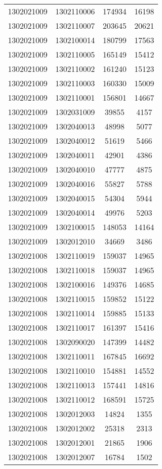 \begin{longtable}{llcc}
1302021009 & 1302110006 & 174934 & 16198\\
1302021009 & 1302110007 & 203645 & 20621\\
1302021009 & 1302100014 & 180799 & 17563\\
1302021009 & 1302110005 & 165149 & 15412\\
1302021009 & 1302110002 & 161240 & 15123\\
1302021009 & 1302110003 & 160330 & 15009\\
1302021009 & 1302110001 & 156801 & 14667\\
1302021009 & 1302031009 & 39855 & 4157\\
1302021009 & 1302040013 & 48998 & 5077\\
1302021009 & 1302040012 & 51619 & 5466\\
1302021009 & 1302040011 & 42901 & 4386\\
1302021009 & 1302040010 & 47777 & 4875\\
1302021009 & 1302040016 & 55827 & 5788\\
1302021009 & 1302040015 & 54304 & 5944\\
1302021009 & 1302040014 & 49976 & 5203\\
1302021009 & 1302100015 & 148053 & 14164\\
1302021009 & 1302012010 & 34669 & 3486\\
1302021008 & 1302110019 & 159037 & 14965\\
1302021008 & 1302110018 & 159037 & 14965\\
1302021008 & 1302100016 & 149376 & 14685\\
1302021008 & 1302110015 & 159852 & 15122\\
1302021008 & 1302110014 & 159885 & 15133\\
1302021008 & 1302110017 & 161397 & 15416\\
1302021008 & 1302090020 & 147399 & 14482\\
1302021008 & 1302110011 & 167845 & 16692\\
1302021008 & 1302110010 & 154881 & 14552\\
1302021008 & 1302110013 & 157441 & 14816\\
1302021008 & 1302110012 & 168591 & 15725\\
1302021008 & 1302012003 & 14824 & 1355\\
1302021008 & 1302012002 & 25318 & 2313\\
1302021008 & 1302012001 & 21865 & 1906\\
1302021008 & 1302012007 & 16784 & 1502\\

\end{longtable}
